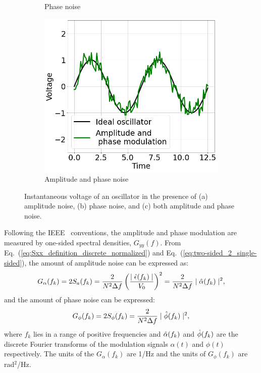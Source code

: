 \begin{figure}[!ht]
\begin{subfigure}[b]{0.45 \textwidth}
        \caption{Phase noise}
        \label{fig:AN_PN_example_b}
    \end{subfigure}
    \hfill
    \begin{subfigure}[b]{0.45\textwidth}
        \centering
        \includegraphics[width=1\textwidth]{./images/app_B/oscillator_example_AN_PN.png}
        \caption{Amplitude and phase noise}
        \label{fig:AN_PN_example_c}
    \end{subfigure}
    \hfill
    \caption{Instantaneous voltage of an oscillator in the presence of (a) amplitude noise, (b) phase noise, and (c) both amplitude and phase noise.}
    \label{fig:AN_PN_example}
\end{figure}

Following the IEEE~\cite{IEEE:4797525} conventions, the amplitude and phase modulation are measured by one-sided spectral densities, $G_{yy}(f)$. From Eq.~(\ref{eq:Sxx_definition_discrete_normalized}) and Eq.~(\ref{eq:two-sided_2_single-sided}), the amount of amplitude noise can be expressed as:
\begin{equation}\label{eq:AN_measure}
    G_\alpha(f_k) = 2 S_a(f_k)=\frac{2}{N^2 \Delta f} \left (  \frac{\mid\hat{\epsilon}(f_k)\mid}{V_0} \right ) ^2=\frac{2}{N^2\Delta f } \mid \hat{\alpha}(f_k) \mid ^2,
\end{equation}
and the amount of phase noise can be expressed:
\begin{equation}\label{eq:PN_measure}
    G_\phi(f_k) = 2 S_\phi(f_k)=\frac{2}{N^2 \Delta f} \mid \hat{\phi}(f_k) \mid ^2,
\end{equation}
where $f_k$ lies in a range of positive frequencies and $\hat{\alpha}(f_k)$ and $\hat{\phi}(f_k)$ are the discrete Fourier transforms of the modulation signals $\alpha(t)$ and $\phi(t)$ respectively. The units of the $G_\alpha(f_k)$ are 1/Hz and the units of $G_\phi(f_k)$ are rad$^2$/Hz.

